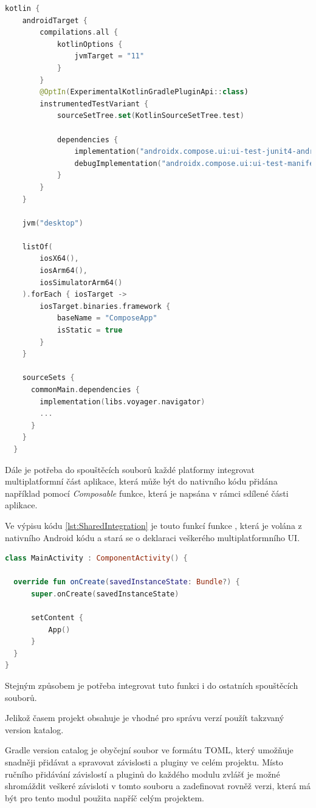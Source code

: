 \begin{lstlisting}[caption={Lib integration}, label={lst:LibIntegration}, language=Kotlin]
  kotlin {
    androidTarget {
        compilations.all {
            kotlinOptions {
                jvmTarget = "11"
            }
        }
        @OptIn(ExperimentalKotlinGradlePluginApi::class)
        instrumentedTestVariant {
            sourceSetTree.set(KotlinSourceSetTree.test)

            dependencies {
                implementation("androidx.compose.ui:ui-test-junit4-android:1.6.4")
                debugImplementation("androidx.compose.ui:ui-test-manifest:1.6.4")
            }
        }
    }

    jvm("desktop")

    listOf(
        iosX64(),
        iosArm64(),
        iosSimulatorArm64()
    ).forEach { iosTarget ->
        iosTarget.binaries.framework {
            baseName = "ComposeApp"
            isStatic = true
        }
    }

    sourceSets {
      commonMain.dependencies {
        implementation(libs.voyager.navigator)
        ...
      }
    }
  }
\end{lstlisting}

Dále je potřeba do spouštěcích souborů každé platformy integrovat multiplatformní část aplikace, která může být do nativního kódu přidána
například pomocí \textit{Composable} funkce, která je napsána v rámci sdílené části aplikace.

Ve výpisu kódu \ref{lst:SharedIntegration} je touto funkcí funkce , která je volána z nativního Android kódu a stará se
o deklaraci veškerého multiplatformního UI.

\begin{lstlisting}[caption={Lib integration}, label={lst:SharedIntegration}, language=Kotlin]
class MainActivity : ComponentActivity() {

  override fun onCreate(savedInstanceState: Bundle?) {
      super.onCreate(savedInstanceState)

      setContent {
          App()
      }
  }
}
\end{lstlisting}

Stejným způsobem je potřeba integrovat tuto funkci i do ostatních spouštěcích souborů. 



Jelikož časem projekt obsahuje je vhodné pro správu verzí použít takzvaný version katalog. 

Gradle version catalog je obyčejní soubor ve formátu TOML, který umožňuje snadněji přidávat a spravovat závislosti a pluginy ve celém projektu. 
Místo ručního přidávání závislostí a pluginů do každého modulu zvlášť je možné shromáždit veškeré závisloti v tomto souboru a zadefinovat rovněž
verzi, která má být pro tento modul použita napříč celým projektem. 

